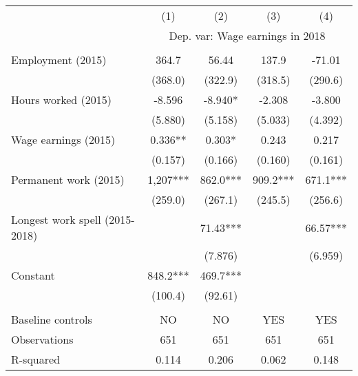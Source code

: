  \begin{tabular}{lcccc} \hline
 & (1) & (2) & (3) & (4) \\
  & \multicolumn{4}{c}{Dep. var: Wage earnings in 2018}\\ \hline
 &  &  &  &  \\
Employment (2015)  & 364.7 & 56.44 & 137.9 & -71.01 \\
 & (368.0) & (322.9) & (318.5) & (290.6) \\
Hours worked (2015)  & -8.596 & -8.940* & -2.308 & -3.800 \\
 & (5.880) & (5.158) & (5.033) & (4.392) \\
Wage earnings (2015) & 0.336** & 0.303* & 0.243 & 0.217 \\
 & (0.157) & (0.166) & (0.160) & (0.161) \\
Permanent work (2015) & 1,207*** & 862.0*** & 909.2*** & 671.1*** \\
 & (259.0) & (267.1) & (245.5) & (256.6) \\
Longest work spell (2015-2018) &  & 71.43*** &  & 66.57*** \\
 &  & (7.876) &  & (6.959) \\
Constant & 848.2*** & 469.7*** &  &  \\
 & (100.4) & (92.61) &  &  \\
 &  &  &  &  \\
Baseline controls & NO & NO & YES & YES \\
Observations & 651 & 651 & 651 & 651 \\
 R-squared & 0.114 & 0.206 & 0.062 & 0.148 \\ \hline
\end{tabular}
 